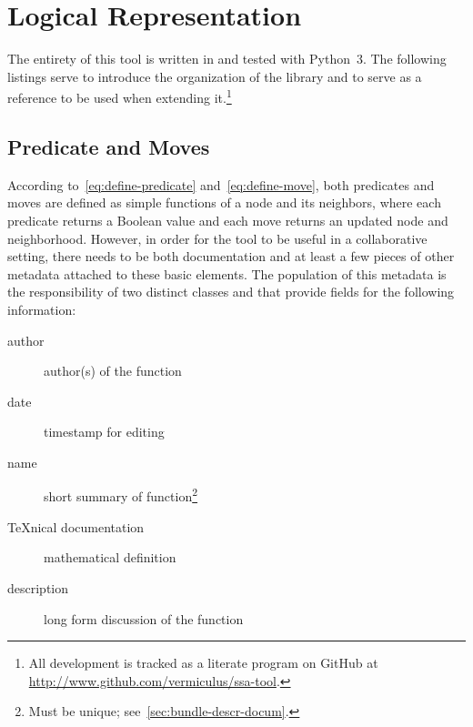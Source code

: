 \section{Logical Representation}
\label{sec:logic-repr}

The entirety of this tool is written in and tested with Python~3.
The following listings serve to introduce the organization of the library and
  to serve as a reference to be used when extending it.\footnote{%
    All development is tracked as a literate program on GitHub
    at \url{http://www.github.com/vermiculus/ssa-tool}.}

\subsection{Predicate and Moves}
\label{sec:logic-repr:predicate-move}

According to~\autoref{eq:define-predicate} and~\autoref{eq:define-move},
  both predicates and moves are defined as simple functions of
  a node and its neighbors, where
  each predicate returns a Boolean value and
  each move returns an updated node and neighborhood.
However, in order for the tool to be useful in a collaborative setting,
  there needs to be both documentation
  and at least a few pieces of other metadata attached to these basic elements.
The population of this metadata is the responsibility of two distinct classes
  \Dash {} and  \Dash
  that provide fields for the following information:
  \begin{description}
  \item[author] author(s) of the function
  \item[date] timestamp for editing
  \item[name] short summary of function\footnote{Must be unique; see~\autoref{sec:bundle-descr-docum}.}
  \item[\TeX nical documentation] mathematical definition
  \item[description] long form discussion of the function
  \end{description}

